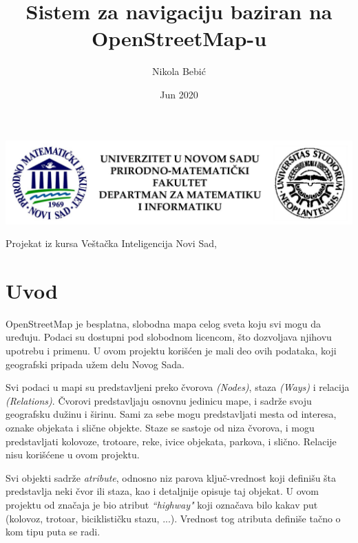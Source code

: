 \documentclass[a4paper]{article}
\title{Sistem za navigaciju baziran na OpenStreetMap-u}
\author{Nikola Bebić}
\date{Jun 2020}
\begin{document}
\begin{titlepage}
    \centering
    \includegraphics[width=1\linewidth]{usnp.png}
    
    \vspace{8em}
    
    \@author
    
    \vspace{4em}
    
    {\bfseries\huge
        \@title
    }
    
    \vspace{2em}
    
    {\large
        Projekat iz kursa Veštačka Inteligencija
    }
    \vfill
    Novi Sad, \@date
\end{titlepage}

\makeatother

\tableofcontents

\newpage

\section{Uvod}

OpenStreetMap je besplatna, slobodna mapa celog sveta koju svi mogu da uređuju.
Podaci su dostupni pod slobodnom licencom, što dozvoljava njihovu upotrebu i primenu.
U ovom projektu korišćen je mali deo ovih podataka, koji geografski pripada užem delu Novog Sada.

Svi podaci u mapi su predstavljeni preko čvorova \emph{(Nodes)}, staza \emph{(Ways)} i relacija \emph{(Relations)}.
Čvorovi predstavljaju osnovnu jedinicu mape, i sadrže svoju geografsku dužinu i širinu.
Sami za sebe mogu predstavljati mesta od interesa, oznake objekata i slične objekte.
Staze se sastoje od niza čvorova, i mogu predstavljati kolovoze, trotoare, reke, ivice objekata, parkova, i slično. Relacije nisu korišćene u ovom projektu.

Svi objekti sadrže \emph{atribute}, odnosno niz parova ključ-vrednost koji definišu šta predstavlja neki čvor ili staza, kao i detaljnije opisuje taj objekat.
U ovom projektu od značaja je bio atribut \emph{``highway"} koji označava bilo kakav put (kolovoz, trotoar, biciklističku stazu, ...).
Vrednost tog atributa definiše tačno o kom tipu puta se radi.
\end{document}
